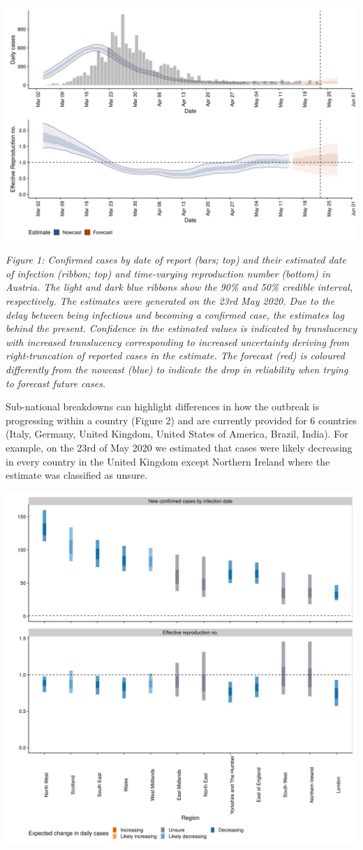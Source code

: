 \documentclass[
]{article}
\begin{document}
\includegraphics[width=0.9\linewidth]{figures/figure_1}

\emph{Figure 1: Confirmed cases by date of report (bars; top) and their
estimated date of infection (ribbon; top) and time-varying reproduction
number (bottom) in Austria. The light and dark blue ribbons show the
90\% and 50\% credible interval, respectively. The estimates were
generated on the 23rd May 2020. Due to the delay between being
infectious and becoming a confirmed case, the estimates lag behind the
present. Confidence in the estimated values is indicated by translucency
with increased translucency corresponding to increased uncertainty
deriving from right-truncation of reported cases in the estimate. The
forecast (red) is coloured differently from the nowcast (blue) to
indicate the drop in reliability when trying to forecast future cases.}

Sub-national breakdowns can highlight differences in how the outbreak is
progressing within a country (Figure 2) and are currently provided for 6
countries (Italy, Germany, United Kingdom, United States of America,
Brazil, India). For example, on the 23rd of May 2020 we estimated that
cases were likely decreasing in every country in the United Kingdom
except Northern Ireland where the estimate was classified as unsure.

\includegraphics[width=0.9\linewidth]{figures/figure_2}
\end{document}
